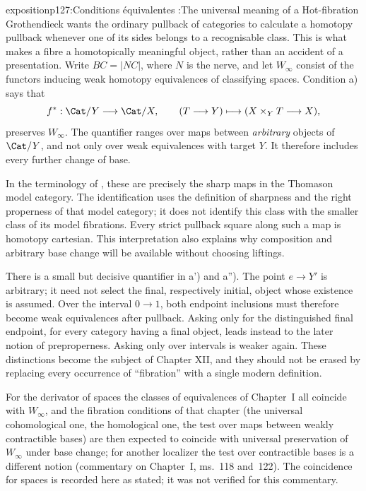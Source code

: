 
\begin{dcomment}{exposition}{p127:Conditions équivalentes :}{The universal meaning of a Hot-fibration}
Grothendieck wants the ordinary pullback of categories to calculate a homotopy pullback whenever one of its sides belongs to a recognisable class. This is what makes a fibre a homotopically meaningful object, rather than an accident of a presentation. Write \(BC=|NC|\), where \(N\) is the nerve, and let \(W_\infty\) consist of the functors inducing weak homotopy equivalences of classifying spaces. Condition a) says that
\[
 f^*:\Cat/Y\longrightarrow\Cat/X,\qquad
 (T\longrightarrow Y)\longmapsto(X\times_Y T\longrightarrow X),
\]
preserves \(W_\infty\). The quantifier ranges over maps between \emph{arbitrary} objects of \(\Cat/Y\), and not only over weak equivalences with target \(Y\). It therefore includes every further change of base.

In the terminology of \citet[\S2, Proposition 2.7]{Rezk1998Sharp}, these are precisely the sharp maps in the Thomason model category. The identification uses the definition of sharpness and the right properness of that model category; it does not identify this class with the smaller class of its model fibrations. Every strict pullback square along such a map is homotopy cartesian. This interpretation also explains why composition and arbitrary base change will be available without choosing liftings.

There is a small but decisive quantifier in a') and a''). The point \(e\longrightarrow Y'\) is arbitrary; it need not select the final, respectively initial, object whose existence is assumed. Over the interval \(0\longrightarrow1\), both endpoint inclusions must therefore become weak equivalences after pullback. Asking only for the distinguished final endpoint, for every category having a final object, leads instead to the later notion of preproperness. Asking only over intervals is weaker again. These distinctions become the subject of Chapter XII, and they should not be erased by replacing every occurrence of “fibration” with a single modern definition.

For the derivator of spaces the classes of equivalences of Chapter~I all coincide with $W_\infty$, and the fibration conditions of that chapter (the universal cohomological one, the homological one, the test over maps between weakly contractible bases) are then expected to coincide with universal preservation of $W_\infty$ under base change; for another localizer the test over contractible bases is a different notion (commentary on Chapter~I, ms.~118 and~122). The coincidence for spaces is recorded here as stated; it was not verified for this commentary.
\end{dcomment}

